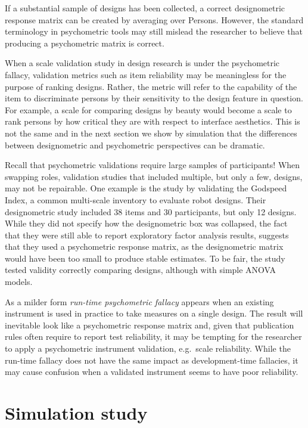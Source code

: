 \documentclass[
  authoryear,
  review]{elsarticle}
\begin{document}
If a substantial sample of designs has been collected, a correct
designometric response matrix can be created by averaging over Persons.
However, the standard terminology in psychometric tools may still
mislead the researcher to believe that producing a psychometric matrix
is correct.

When a scale validation study in design research is under the
psychometric fallacy, validation metrics such as item reliability may be
meaningless for the purpose of ranking designs. Rather, the metric will
refer to the capability of the item to discriminate persons by their
sensitivity to the design feature in question. For example, a scale for
comparing designs by beauty would become a scale to rank persons by how
critical they are with respect to interface aesthetics. This is not the
same and in the next section we show by simulation that the differences
between designometric and psychometric perspectives can be dramatic.

Recall that psychometric validations require large samples of
participants! When swapping roles, validation studies that included
multiple, but only a few, designs, may not be repairable. One example is
the study by \citet{Ho2010} validating the Godspeed Index, a common
multi-scale inventory to evaluate robot designs. Their designometric
study included 38 items and 30 participants, but only 12 designs. While
they did not specify how the designometric box was collapsed, the fact
that they were still able to report exploratory factor analysis results,
suggests that they used a psychometric response matrix, as the
designometric matrix would have been too small to produce stable
estimates. To be fair, the study tested validity correctly comparing
designs, although with simple ANOVA models.

As a milder form \emph{run-time psychometric fallacy} appears when an
existing instrument is used in practice to take measures on a single
design. The result will inevitable look like a psychometric response
matrix and, given that publication rules often require to report test
reliability, it may be tempting for the researcher to apply a
psychometric instrument validation, e.g.~scale reliability. While the
run-time fallacy does not have the same impact as development-time
fallacies, it may cause confusion when a validated instrument seems to
have poor reliability.

\section{Simulation study}\label{simulation-study}
\end{document}
